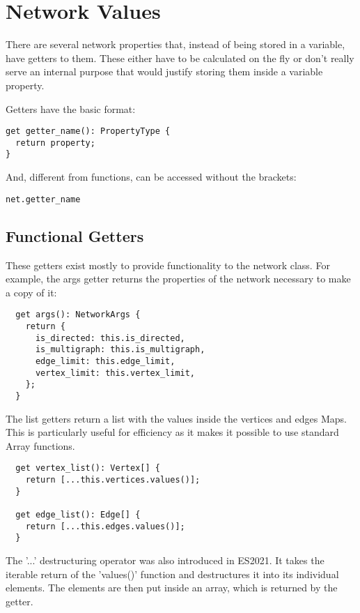 \chapter{Network Values}
There are several network properties that, instead of being stored in a variable, have getters to them. These either have to be calculated on the fly or don't really serve an internal purpose that would justify storing them inside a variable property.

Getters have the basic format:

\begin{verbatim}
get getter_name(): PropertyType {
  return property;
}
\end{verbatim}

And, different from functions, can be accessed without the brackets:

\begin{verbatim}
net.getter_name
\end{verbatim}

\section{Functional Getters}
These getters exist mostly to provide functionality to the network class. For example, the args getter returns the properties of the network necessary to make a copy of it:

\begin{verbatim}
  get args(): NetworkArgs {
    return {
      is_directed: this.is_directed,
      is_multigraph: this.is_multigraph,
      edge_limit: this.edge_limit,
      vertex_limit: this.vertex_limit,
    };
  }
\end{verbatim}

The list getters return a list with the values inside the vertices and edges Maps. This is particularly useful for efficiency as it makes it possible to use standard Array functions.

\begin{verbatim}
  get vertex_list(): Vertex[] {
    return [...this.vertices.values()];
  }

  get edge_list(): Edge[] {
    return [...this.edges.values()];
  }
\end{verbatim}

The '...' destructuring operator was also introduced in ES2021. It takes the iterable return of the 'values()' function and destructures it into its individual elements. The elements are then put inside an array, which is returned by the getter.

